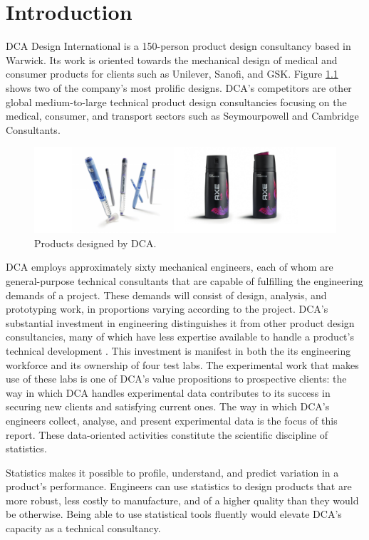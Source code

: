 \documentclass[11pt,a4paper,article]{memoir} %
\begin{document}
\chapter{Introduction}
DCA Design International is a 150-person product design consultancy based in Warwick. Its work is oriented towards the mechanical design of medical and consumer products for clients such as Unilever, Sanofi, and GSK. Figure \ref{fig:dca_profile} shows two of the company's most prolific designs. DCA's competitors are other global medium-to-large technical product design consultancies focusing on the medical, consumer, and transport sectors such as Seymourpowell and Cambridge Consultants.
\par
\begin{figure}[b]
\includegraphics[width=\textwidth]{DCA_profile.pdf}
\caption{Products designed by DCA.}
\label{fig:dca_profile}
\end{figure}
\par
DCA employs approximately sixty mechanical engineers, each of whom are general-purpose technical consultants that are capable of fulfilling the engineering demands of a project. These demands will consist of design, analysis, and prototyping work, in proportions varying according to the project. DCA's substantial investment in engineering distinguishes it from other product design consultancies, many of which have less expertise available to handle a product's technical development \cite{designweek}. This investment is manifest in both the its engineering workforce and its ownership of four test labs. The experimental work that makes use of these labs is one of DCA's value propositions to prospective clients: the way in which DCA handles experimental data contributes to its success in securing new clients and satisfying current ones. The way in which DCA's engineers collect, analyse, and present experimental data is the focus of this report. These data-oriented activities constitute the scientific discipline of statistics.
\par
Statistics makes it possible to profile, understand, and predict variation in a product's performance. Engineers can use statistics to design products that are more robust, less costly to manufacture, and of a higher quality than they would be otherwise. Being able to use statistical tools fluently would elevate DCA's capacity as a technical consultancy.
\end{document}
